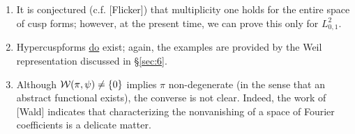 \subsection{}
\label{sec:2.5}

\begin{remark*}
\begin{enumerate}[label=(\roman*)]
    \item It is conjectured (c.f. [Flicker]) that multiplicity one holds for the entire space of cusp forms; however, at the present time, we can prove this only for $L_{0, 1}^{2}$.
    \item Hypercuspforms \underline{do} exist; again, the examples are provided by the Weil representation discussed in \S \ref{sec:6}.
    \item Although $\mathcal{W}(\pi, \psi) \neq \{0\}$ implies $\pi$ non-degenerate (in the sense that an abstract functional exists), the converse is not clear.
    Indeed, the work of [Wald] indicates that characterizing the nonvanishing of a space of Fourier coefficients is a delicate matter.
\end{enumerate} 
\end{remark*}
